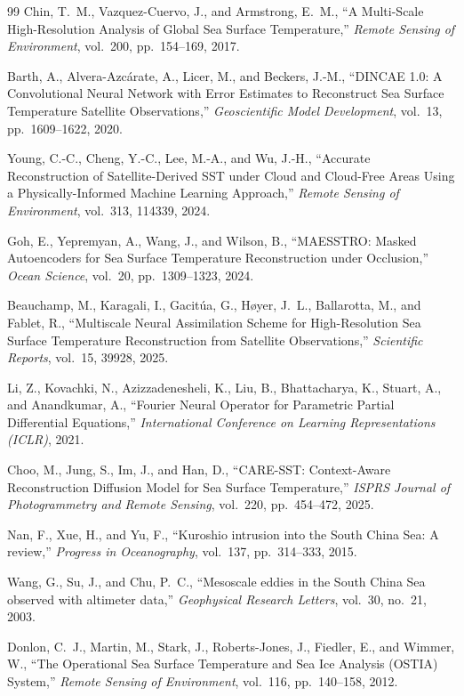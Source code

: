 \documentclass[12pt,reqno]{amsart}
\begin{document}
\begin{thebibliography}{99}
Chin, T.~M., Vazquez-Cuervo, J., and Armstrong, E.~M.,
``A Multi-Scale High-Resolution Analysis of Global Sea Surface Temperature,''
\textit{Remote Sensing of Environment}, vol.~200, pp.~154--169, 2017.

Barth, A., Alvera-Azc\'arate, A., Licer, M., and Beckers, J.-M.,
``DINCAE 1.0: A Convolutional Neural Network with Error Estimates to Reconstruct Sea Surface Temperature Satellite Observations,''
\textit{Geoscientific Model Development}, vol.~13, pp.~1609--1622, 2020.

Young, C.-C., Cheng, Y.-C., Lee, M.-A., and Wu, J.-H.,
``Accurate Reconstruction of Satellite-Derived SST under Cloud and Cloud-Free Areas Using a Physically-Informed Machine Learning Approach,''
\textit{Remote Sensing of Environment}, vol.~313, 114339, 2024.

Goh, E., Yepremyan, A., Wang, J., and Wilson, B.,
``MAESSTRO: Masked Autoencoders for Sea Surface Temperature Reconstruction under Occlusion,''
\textit{Ocean Science}, vol.~20, pp.~1309--1323, 2024.

Beauchamp, M., Karagali, I., Gacit\'ua, G., H{\o}yer, J.~L., Ballarotta, M., and Fablet, R.,
``Multiscale Neural Assimilation Scheme for High-Resolution Sea Surface Temperature Reconstruction from Satellite Observations,''
\textit{Scientific Reports}, vol.~15, 39928, 2025.

Li, Z., Kovachki, N., Azizzadenesheli, K., Liu, B., Bhattacharya, K., Stuart, A., and Anandkumar, A.,
``Fourier Neural Operator for Parametric Partial Differential Equations,''
\textit{International Conference on Learning Representations (ICLR)}, 2021.

Choo, M., Jung, S., Im, J., and Han, D.,
``CARE-SST: Context-Aware Reconstruction Diffusion Model for Sea Surface Temperature,''
\textit{ISPRS Journal of Photogrammetry and Remote Sensing}, vol.~220, pp.~454--472, 2025.


Nan, F., Xue, H., and Yu, F.,
``Kuroshio intrusion into the South China Sea: A review,''
\textit{Progress in Oceanography}, vol.~137, pp.~314--333, 2015.

Wang, G., Su, J., and Chu, P.~C.,
``Mesoscale eddies in the South China Sea observed with altimeter data,''
\textit{Geophysical Research Letters}, vol.~30, no.~21, 2003.

Donlon, C.~J., Martin, M., Stark, J., Roberts-Jones, J., Fiedler, E., and Wimmer, W.,
``The Operational Sea Surface Temperature and Sea Ice Analysis (OSTIA) System,''
\textit{Remote Sensing of Environment}, vol.~116, pp.~140--158, 2012.


\end{thebibliography}
\end{document}
